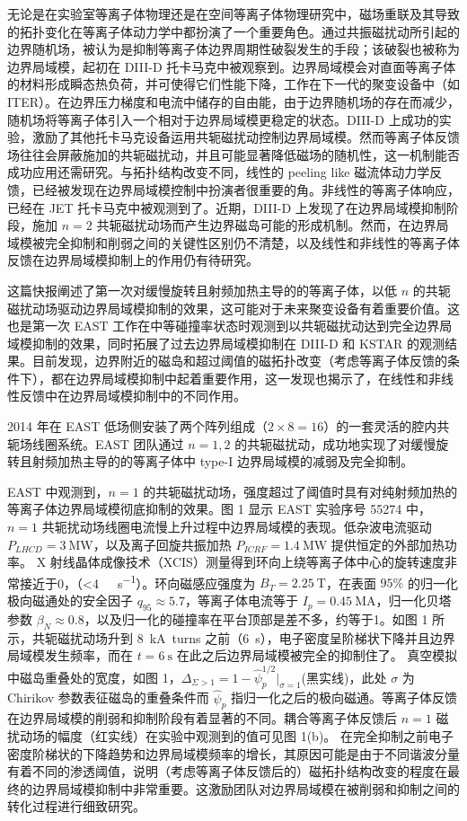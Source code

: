 无论是在实验室等离子体物理还是在空间等离子体物理研究中，磁场重联及其导致的拓扑变化在等离子体动力学中都扮演了一个重要角色。通过共振磁扰动所引起的边界随机场，被认为是抑制等离子体边界周期性破裂发生的手段；该破裂也被称为边界局域模，起初在 DIII-D 托卡马克中被观察到。边界局域模会对直面等离子体的材料形成瞬态热负荷，并可使得它们性能下降，工作在下一代的聚变设备中（如 ITER）。在边界压力梯度和电流中储存的自由能，由于边界随机场的存在而减少，随机场将等离子体引入一个相对于边界局域模更稳定的状态。DIII-D 上成功的实验，激励了其他托卡马克设备运用共轭磁扰动控制边界局域模。然而等离子体反馈场往往会屏蔽施加的共轭磁扰动，并且可能显著降低磁场的随机性，这一机制能否成功应用还需研究。与拓扑结构改变不同，线性的 peeling like 磁流体动力学反馈，已经被发现在边界局域模控制中扮演者很重要的角。非线性的等离子体响应，已经在 JET 托卡马克中被观测到了。近期，DIII-D 上发现了在边界局域模抑制阶段，施加 $n=2$ 共轭磁扰动场而产生边界磁岛可能的形成机制。然而，在边界局域模被完全抑制和削弱之间的关键性区别仍不清楚，以及线性和非线性的等离子体反馈在边界局域模抑制上的作用仍有待研究。

这篇快报阐述了第一次对缓慢旋转且射频加热主导的的等离子体，以低 $n$ 的共轭磁扰动场驱动边界局域模抑制的效果，这可能对于未来聚变设备有着重要价值。这也是第一次 EAST 工作在中等碰撞率状态时观测到以共轭磁扰动达到完全边界局域模抑制的效果，同时拓展了过去边界局域模抑制在 DIII-D 和 KSTAR 的观测结果。目前发现，边界附近的磁岛和超过阈值的磁拓扑改变（考虑等离子体反馈的条件下），都在边界局域模抑制中起着重要作用，这一发现也揭示了，在线性和非线性反馈中在边界局域模抑制中的不同作用。

2014 年在 EAST 低场侧安装了两个阵列组成（$2×8=16$）的一套灵活的腔内共轭场线圈系统。EAST 团队通过 $n=1,2$ 的共轭磁扰动，成功地实现了对缓慢旋转且射频加热主导的的等离子体中 type-I 边界局域模的减弱及完全抑制。

EAST 中观测到，$n=1$ 的共轭磁扰动场，强度超过了阈值时具有对纯射频加热的等离子体边界局域模彻底抑制的效果。图 1 显示 EAST 实验序号 55274 中，$n=1$ 共轭扰动场线圈电流慢上升过程中边界局域模的表现。低杂波电流驱动 $P_{LHCD}=\SI{3}{\mega\watt}$，以及离子回旋共振加热 $P_{ICRF}=\SI{1.4}{\mega\watt}$ 提供恒定的外部加热功率。 X 射线晶体成像技术（XCIS）测量得到环向上绕等离子体中心的旋转速度非常接近于0，（<\SI{4}{\kilo\rad\per\second}）。环向磁感应强度为 $B_T = \SI{2.25}{\tesla}$，在表面 $95\%$ 的归一化极向磁通处的安全因子 $q_{95}\approx 5.7$，等离子体电流等于 $I_p=\SI{0.45}{\mega\ampere}$，归一化贝塔参数 $\beta_N \approx 0.8$，以及归一化的碰撞率在平台顶部是差不多，约等于1。如图 1 所示，共轭磁扰动场升到 \SI{8}{\kilo\ampere turns} 之前（\SI{6}{\second}），电子密度呈阶梯状下降并且边界局域模发生频率，而在 $t=\SI{6}{\second}$ 在此之后边界局域模被完全的抑制住了。
真空模拟中磁岛重叠处的宽度，如图 1，$\Delta_{\Sigma>1}=1-\hat{\psi}_p^{1/2}|_{\sigma=1}$(黑实线)，此处 $\sigma$ 为 Chirikov 参数表征磁岛的重叠条件而 $\hat{\psi}_p$ 指归一化之后的极向磁通。等离子体反馈在边界局域模的削弱和抑制阶段有着显著的不同。耦合等离子体反馈后 $n=1$ 磁扰动场的幅度（红实线）在实验中观测到的值可见图 1(b)。
在完全抑制之前电子密度阶梯状的下降趋势和边界局域模频率的增长，其原因可能是由于不同谐波分量有着不同的渗透阈值，说明（考虑等离子体反馈后的）磁拓扑结构改变的程度在最终的边界局域模抑制中非常重要。这激励团队对边界局域模在被削弱和抑制之间的转化过程进行细致研究。


